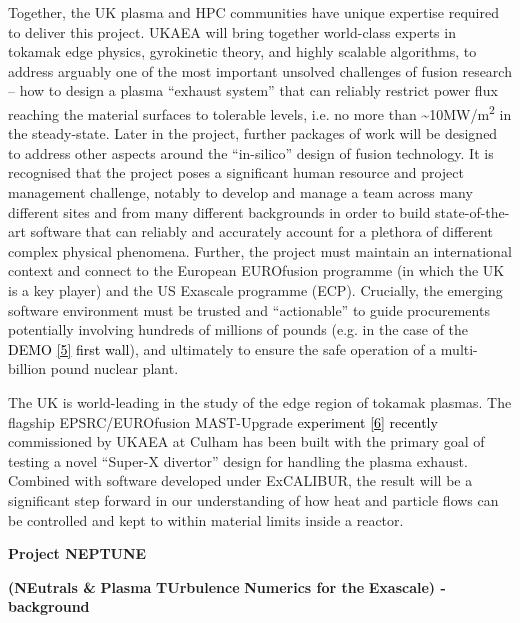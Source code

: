 \documentclass[a4paper]{article}
\newcommand\textstyleInternetlink[1]{\textcolor{blue}{#1}}
\begin{document}
Together, the UK plasma and HPC communities have unique expertise required to deliver this project. UKAEA will bring
together world-class experts in tokamak edge physics, gyrokinetic theory, and highly scalable algorithms, to address
arguably one of the most important unsolved challenges of fusion research -- how to design a plasma ``exhaust system''
that can reliably restrict power flux reaching the material surfaces to tolerable levels, i.e. no more than
\~{}10MW/m\textsuperscript{2} in the steady-state. Later in the project, further packages of work will be designed to
address other aspects around the ``in-silico'' design of fusion technology. It is recognised that the project poses a
significant human resource and project management challenge, notably to develop and manage a team across many different
sites and from many different backgrounds in order to build state-of-the-art software that can reliably and accurately
account for a plethora of different complex physical phenomena. Further, the project must maintain an international
context and connect to the European EUROfusion programme (in which the UK is a key player) and the US Exascale
programme (ECP). Crucially, the emerging software environment must be trusted and ``actionable'' to guide procurements
potentially involving hundreds of millions of pounds (e.g. in the case of the \textcolor{black}{DEMO
}\href{https://www.euro-fusion.org/programme/demo/}{\textstyleInternetlink{\textcolor{black}{[5]}}}\textcolor{black}{
first wall}), and ultimately to ensure the safe operation of a multi-billion pound nuclear plant.


\bigskip

The UK is world-leading in the study of the edge region of tokamak plasmas. The flagship EPSRC/EUROfusion MAST-Upgrade
\textcolor{black}{experiment
}\href{https://reuters.screenocean.com/record/1366443}{\textstyleInternetlink{\textcolor{black}{[6]}}}\textcolor{black}{
recently }commissioned by UKAEA at Culham has been built with the primary goal of testing a novel ``Super-X divertor''
design for handling the plasma exhaust. Combined with software developed under ExCALIBUR, the result will be a
significant step forward in our understanding of how heat and particle flows can be controlled and kept to within
material limits inside a reactor.


\bigskip

\textbf{\textcolor[rgb]{0.12156863,0.28627452,0.49019608}{Project NEPTUNE}}

\textbf{(}\textbf{\textcolor[rgb]{0.12156863,0.28627452,0.49019608}{NE}}\textbf{utrals \&
}\textbf{\textcolor[rgb]{0.12156863,0.28627452,0.49019608}{P}}\textbf{lasma
}\textbf{\textcolor[rgb]{0.12156863,0.28627452,0.49019608}{TU}}\textbf{rbulence
}\textbf{\textcolor[rgb]{0.12156863,0.28627452,0.49019608}{N}}\textbf{umerics for the
}\textbf{\textcolor[rgb]{0.12156863,0.28627452,0.49019608}{E}}\textbf{xascale) - background}
\end{document}

